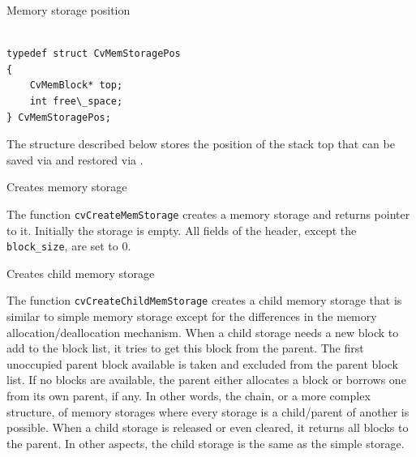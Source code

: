 \label{CvMemStoragePos}

Memory storage position

\begin{lstlisting}

typedef struct CvMemStoragePos
{
    CvMemBlock* top;
    int free\_space;
} CvMemStoragePos;

\end{lstlisting}

The structure described below stores the position of the stack top that can be saved via  and restored via .

\label{CreateMemStorage}

Creates memory storage


\begin{description}
\end{description}

The function \texttt{cvCreateMemStorage} creates a memory storage and returns pointer to it. Initially the storage is empty. All fields of the header, except the \texttt{block\_size}, are set to 0.


\label{CreateChildMemStorage}

Creates child memory storage


\begin{description}
\end{description}


The function \texttt{cvCreateChildMemStorage} creates a child memory
storage that is similar to simple memory storage except for the
differences in the memory allocation/deallocation mechanism. When a
child storage needs a new block to add to the block list, it tries
to get this block from the parent. The first unoccupied parent block
available is taken and excluded from the parent block list. If no blocks
are available, the parent either allocates a block or borrows one from
its own parent, if any. In other words, the chain, or a more complex
structure, of memory storages where every storage is a child/parent of
another is possible. When a child storage is released or even cleared,
it returns all blocks to the parent. In other aspects, the child storage
is the same as the simple storage.

